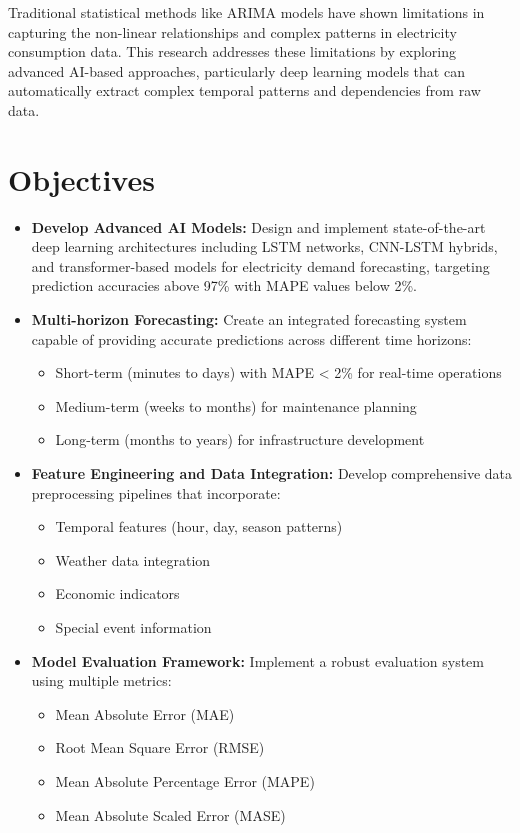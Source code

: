 \documentclass[12pt,a4paper]{report}
\begin{document}
Traditional statistical methods like ARIMA models have shown limitations in capturing the non-linear relationships and complex patterns in electricity consumption data. This research addresses these limitations by exploring advanced AI-based approaches, particularly deep learning models that can automatically extract complex temporal patterns and dependencies from raw data.

\section{Objectives}
\begin{itemize}
\item \textbf{Develop Advanced AI Models:} Design and implement state-of-the-art deep learning architectures including LSTM networks, CNN-LSTM hybrids, and transformer-based models for electricity demand forecasting, targeting prediction accuracies above 97\% with MAPE values below 2\%.

\item \textbf{Multi-horizon Forecasting:} Create an integrated forecasting system capable of providing accurate predictions across different time horizons:
  \begin{itemize}
    \item Short-term (minutes to days) with MAPE < 2\% for real-time operations
    \item Medium-term (weeks to months) for maintenance planning
    \item Long-term (months to years) for infrastructure development
  \end{itemize}

\item \textbf{Feature Engineering and Data Integration:} Develop comprehensive data preprocessing pipelines that incorporate:
  \begin{itemize}
    \item Temporal features (hour, day, season patterns)
    \item Weather data integration
    \item Economic indicators
    \item Special event information
  \end{itemize}

\item \textbf{Model Evaluation Framework:} Implement a robust evaluation system using multiple metrics:
  \begin{itemize}
    \item Mean Absolute Error (MAE)
    \item Root Mean Square Error (RMSE)
    \item Mean Absolute Percentage Error (MAPE)
    \item Mean Absolute Scaled Error (MASE)
  \end{itemize}


\end{itemize}
\end{document}
